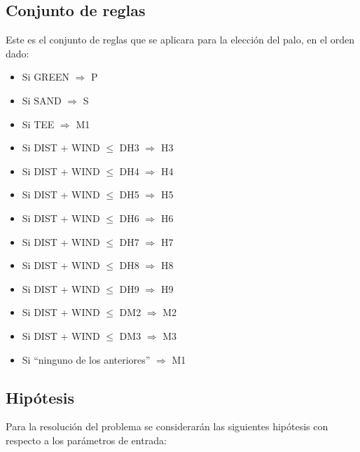 \documentclass[runningheads,a4paper]{llncs}
\begin{document}
\subsection{Conjunto de reglas}

  Este es el conjunto de reglas que se aplicara para la elección del palo, en el
  orden dado:

\begin{itemize}

	\item Si GREEN $\Rightarrow$ P 
	
	\item Si SAND $\Rightarrow$ S
	
	\item Si TEE $\Rightarrow$ M1 
	
	\item Si DIST + WIND $\leq$ DH3 $\Rightarrow$ H3 
	
	\item Si DIST + WIND $\leq$ DH4 $\Rightarrow$ H4 
	
	\item Si DIST + WIND $\leq$ DH5 $\Rightarrow$ H5 
	
	\item Si DIST + WIND $\leq$ DH6 $\Rightarrow$ H6 
	
	\item Si DIST + WIND $\leq$ DH7 $\Rightarrow$ H7 
	
	\item Si DIST + WIND $\leq$ DH8 $\Rightarrow$ H8 
	
	\item Si DIST + WIND $\leq$ DH9 $\Rightarrow$ H9 
	
	\item Si DIST + WIND $\leq$ DM2 $\Rightarrow$ M2
	
	\item Si DIST + WIND $\leq$ DM3 $\Rightarrow$ M3
	
	\item Si “ninguno de los anteriores” $\Rightarrow$ M1
	
\end{itemize}


\subsection{Hipótesis}

  Para la resolución del problema se considerarán las siguientes hipótesis con
  respecto a los parámetros de entrada:\\
\end{document}
